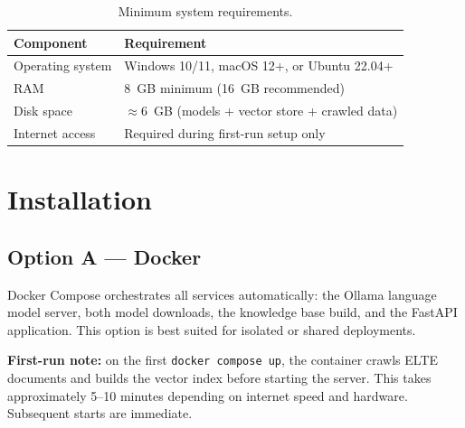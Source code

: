 \begin{table}[H]
    \centering
    \begin{tabular}{ | m{} | m{} | }
        \hline
        \textbf{Component} & \textbf{Requirement} \\
        \hline \hline
        Operating system & Windows 10/11, macOS 12+, or Ubuntu 22.04+ \\
        \hline
        RAM & 8~GB minimum (16~GB recommended) \\
        \hline
        Disk space & $\approx$6~GB (models + vector store + crawled data) \\
        \hline
        Internet access & Required during first-run setup only \\
        \hline
    \end{tabular}
    \caption{Minimum system requirements.}
    \label{tab:user-sysreq}
\end{table}

\section{Installation}
\label{sec:user-install}

\subsection*{Option A --- Docker}

Docker Compose orchestrates all services automatically: the Ollama language
model server, both model downloads, the knowledge base build, and the FastAPI
application. This option is best suited for isolated or shared deployments.

\textbf{First-run note:} on the first \texttt{docker compose up}, the container
crawls ELTE documents and builds the vector index before starting the server.
This takes approximately 5--10 minutes depending on internet speed and hardware.
Subsequent starts are immediate.

